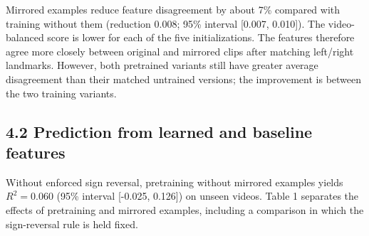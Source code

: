 \documentclass{article}
\begin{document}
Mirrored examples reduce feature disagreement by about 7\% compared with
training without them (reduction 0.008; 95\% interval {[}0.007,
0.010{]}). The video-balanced score is lower for each of the five
initializations. The features therefore agree more closely between
original and mirrored clips after matching left/right landmarks.
However, both pretrained variants still have greater average
disagreement than their matched untrained versions; the improvement is
between the two training variants.

\subsection{4.2 Prediction from learned and baseline
features}\label{prediction-from-learned-and-baseline-features}

Without enforced sign reversal, pretraining without mirrored examples
yields \(R^2=0.060\) (95\% interval {[}-0.025, 0.126{]}) on unseen
videos. Table 1 separates the effects of pretraining and mirrored
examples, including a comparison in which the sign-reversal rule is held
fixed.
\end{document}
